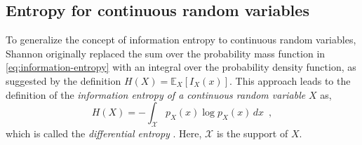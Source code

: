 \subsection{Entropy for continuous random variables}

To generalize the concept of information entropy to continuous random variables, Shannon originally replaced the sum over the probability mass function in \eqref{eq:information-entropy} with an integral over the probability density function, as suggested by the definition $H(X) = \mathbb{E}_X\left[I_X(x)\right]$. This approach leads to the definition of the \emph{information entropy of a continuous random variable} $X$ as, 
%
\begin{equation} \label{eq:differential-entropy}
    H(X) = - \int_{\mathcal{X}} p_X(x) \log p_X(x) \, dx \enspace ,
\end{equation}
%
which is called the \emph{differential entropy} \cite{shannon_mathematical_1948}. Here, $\mathcal{X}$ is the support of $X$. 

